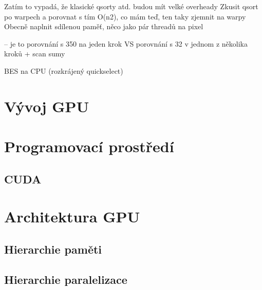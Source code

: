 
    
    
Zatím to vypadá, že klasické qsorty atd. budou mít velké overheady
Zkusit qsort po warpech a porovnat s tím O(n2), co mám teď, ten taky zjemnit na warpy
Obecně naplnit sdílenou paměť, něco jako pár threadů na pixel
    
    -- je to porovnání s 350 na jeden krok VS porovnání s 32 v jednom z několika kroků + scan sumy

BES na CPU (rozkrájený quickselect)

\section{Vývoj GPU}
\section{Programovací prostředí}
    \subsection{CUDA}
\section{Architektura GPU}
    \subsection{Hierarchie paměti}
    \subsection{Hierarchie paralelizace}
